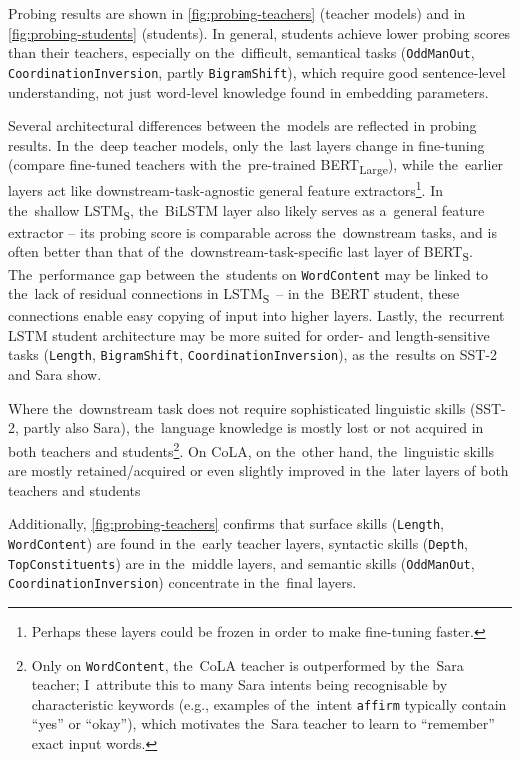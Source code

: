 \documentclass[bsc,frontabs,singlespacing,parskip,deptreport]{infthesis}
\def\BERTS{BERT\textsubscript{S}}
\def\LSTMS{LSTM\textsubscript{S}}
\begin{document}
{{    Probing results are shown in \autoref{fig:probing-teachers} (teacher models) and in \autoref{fig:probing-students} (students).
    In general, students achieve lower probing scores than their teachers,
    especially on the~difficult, semantical tasks (\verb|OddManOut|, \verb|CoordinationInversion|, partly \verb|BigramShift|), which require good sentence-level understanding,
    not just word-level knowledge found in embedding parameters.

    Several architectural differences between the~models are reflected in probing results.
    In the~deep teacher models, only the~last layers change in fine-tuning (compare fine-tuned teachers with the~pre-trained BERT\textsubscript{Large}), while the~earlier layers act like downstream-task-agnostic general feature extractors\footnote{Perhaps these layers could be frozen in order to make fine-tuning faster.}.
    In the~shallow \LSTMS, the~BiLSTM layer also likely serves as a~general feature extractor -- its probing score is comparable across the~downstream tasks, and is often better than that of the~downstream-task-specific last layer of \BERTS.
    The~performance gap between the~students on \verb|WordContent| may be linked to the~lack of residual connections in \LSTMS~-- in the~BERT student, these connections enable easy copying of input into higher layers.
    Lastly, the~recurrent LSTM student architecture may be more suited for order- and length-sensitive tasks (\verb|Length|, \verb|BigramShift|, \verb|CoordinationInversion|), as the~results on SST-2 and Sara show.

    Where the~downstream task does not require sophisticated linguistic skills (SST-2, partly also Sara), the~language knowledge is mostly lost or not acquired in both teachers and students\footnote{Only on \verb|WordContent|, the~CoLA teacher is outperformed by the~Sara teacher; I~attribute this to many Sara intents being recognisable by characteristic keywords (e.g., examples of the~intent \verb|affirm| typically contain ``yes'' or ``okay''), which motivates the~Sara teacher to learn to ``remember'' exact input words.}.
    On CoLA, on the~other hand, the~linguistic skills are mostly retained/acquired or even slightly improved in the~later layers of both teachers and students
    
    Additionally, \autoref{fig:probing-teachers} confirms that surface skills (\verb|Length|, \verb|WordContent|) are found in the~early teacher layers, syntactic skills (\verb|Depth|, \verb|TopConstituents|) are in the~middle layers, and semantic skills (\verb|OddManOut|, \verb|CoordinationInversion|) concentrate in the~final layers.
    
}}
\end{document}
